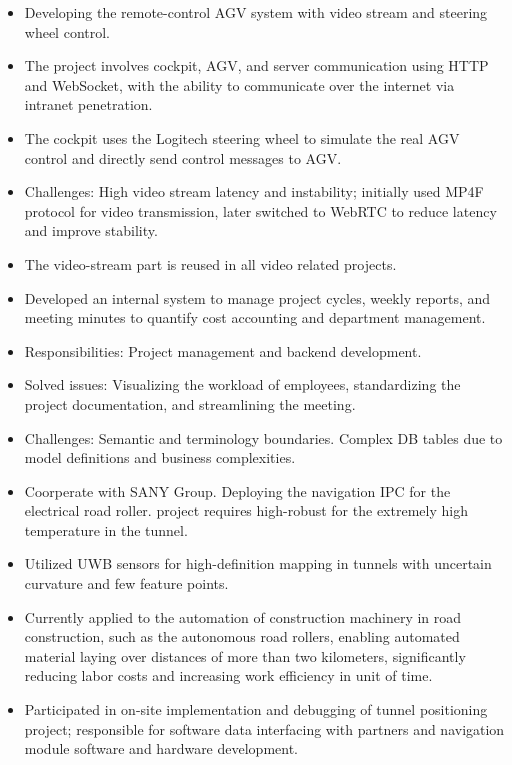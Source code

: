 \documentclass[a4paper,10pt]{resume}
\begin{document}
\begin{itemize}[parsep=0.5ex]
  \item Developing the remote-control AGV system with video stream and steering wheel control.
  \item The project involves cockpit, AGV, and server communication using HTTP and WebSocket, with the ability to communicate over the internet via intranet penetration.
  \item The cockpit uses the Logitech steering wheel to simulate the real AGV control and directly send control messages to AGV.
  \item Challenges: High video stream latency and instability; initially used MP4F protocol for video transmission, later switched to WebRTC to reduce latency and improve stability.
  \item The video-stream part is reused in all video related projects.
\end{itemize}

\begin{itemize}[parsep=0.5ex]
  \item Developed an internal system to manage project cycles, weekly reports, and meeting minutes to quantify cost accounting and department management.
  \item Responsibilities: Project management and backend development.
  \item Solved issues: Visualizing the workload of employees, standardizing the project documentation, and streamlining the meeting.
  \item Challenges: Semantic and terminology boundaries. Complex DB tables due to model definitions and business complexities.
\end{itemize}

\begin{itemize}[parsep=0.5ex]
  \item Coorperate with SANY Group. Deploying the navigation IPC for the electrical road roller. project requires high-robust for the extremely high temperature in the tunnel.
  \item Utilized UWB sensors for high-definition mapping in tunnels with uncertain curvature and few feature points.
  \item Currently applied to the automation of construction machinery in road construction, such as the autonomous road rollers, enabling automated material laying over distances of more than two kilometers, significantly reducing labor costs and increasing work efficiency in unit of time.
  \item Participated in on-site implementation and debugging of tunnel positioning project; responsible for software data interfacing with partners and navigation module software and hardware development.
\end{itemize}
\end{document}
